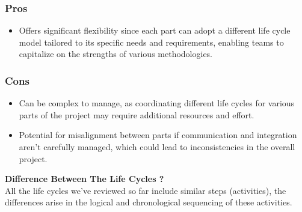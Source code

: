 \subsubsection{Pros}
\begin{itemize} 
\item Offers significant flexibility since each part can adopt a different life cycle model tailored to its specific needs
and requirements, enabling teams to capitalize on the strengths of various methodologies.
\end{itemize}
\subsubsection{Cons}
\begin{itemize}
\item Can be complex to manage, as coordinating different life cycles for various parts of the project may require additional
resources and effort.
\item Potential for misalignment between parts if communication and integration aren’t carefully managed, which could lead
to inconsistencies in the overall project.
\end{itemize}

\vspace{1cm}
\begin{tcolorbox}[title = Note] 
    \textbf{Difference Between The Life Cycles ?}\\

All the life cycles we've reviewed so far include similar steps (activities), the differences arise in the logical and
chronological sequencing of these activities.
\end{tcolorbox}
